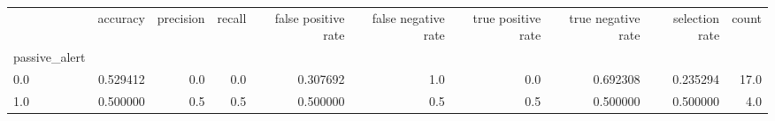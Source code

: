 \begin{tabular}{lrrrrrrrrr}
\toprule
{} &  accuracy &  precision &  recall &  false positive rate &  false negative rate &  true positive rate &  true negative rate &  selection rate &  count \\
passive\_alert &           &            &         &                      &                      &                     &                     &                 &        \\
\midrule
0.0           &  0.529412 &        0.0 &     0.0 &             0.307692 &                  1.0 &                 0.0 &            0.692308 &        0.235294 &   17.0 \\
1.0           &  0.500000 &        0.5 &     0.5 &             0.500000 &                  0.5 &                 0.5 &            0.500000 &        0.500000 &    4.0 \\
\bottomrule
\end{tabular}

